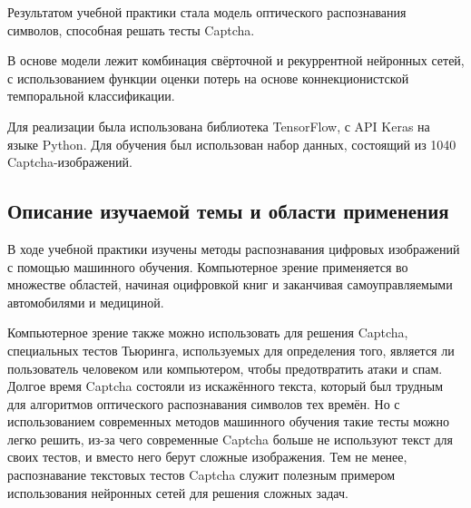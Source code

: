 \documentclass[../document.tex]{subfiles}
\begin{document}
\par Результатом учебной практики стала модель оптического распознавания символов, способная решать тесты Captcha.
\par В основе модели лежит комбинация свёрточной и рекуррентной нейронных сетей, с использованием функции оценки потерь на основе коннекционистской темпоральной классификации.
\par Для реализации была использована библиотека TensorFlow, с API Keras на языке Python. Для обучения был использован набор данных, состоящий из 1040 Captcha-изображений.
\subsection{Описание изучаемой темы и области  применения}
\par В ходе учебной практики изучены методы распознавания цифровых изображений с помощью машинного обучения. Компьютерное зрение применяется во множестве областей, начиная оцифровкой книг и заканчивая самоуправляемыми автомобилями и медициной.
\par Компьютерное зрение также можно использовать для решения Captcha, специальных тестов Тьюринга, используемых для определения того, является ли пользователь человеком или компьютером, чтобы предотвратить атаки и спам. Долгое время Captcha состояли из искажённого текста, который был трудным для алгоритмов оптического распознавания символов тех времён. Но с использованием современных методов машинного обучения такие тесты можно легко решить, из-за чего современные Captcha больше не используют текст для своих тестов, и вместо него берут сложные изображения. Тем не менее, распознавание текстовых тестов Captcha служит полезным примером использования нейронных сетей для решения сложных задач.
\end{document}
